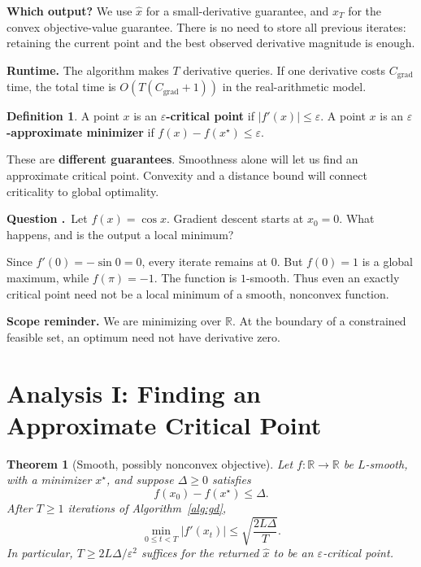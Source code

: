 \documentclass[11pt,letterpaper]{article}
\newif\ifstudentversion
\newcommand{\vs}[1]{\vspace{#1}}
\newcommand{\hide}[1]{%
  \ifstudentversion
    \ifmmode\phantom{#1}\else\underline{\phantom{#1}}\fi
  \else #1\fi}
\theoremstyle{definition}
\newtheorem{definition}{Definition}
\theoremstyle{plain}
\newtheorem{theorem}{Theorem}
\newcounter{question}
\newenvironment{Qu}{%
  \par\medskip\refstepcounter{question}
  \noindent\textbf{Question \thequestion.}\ }{\par\medskip}
\newcommand{\QU}{\begin{Qu}}
\newcommand{\R}{\mathbb R}
\newcommand{\eps}{\varepsilon}
\newcommand{\xstar}{x^\star}
\begin{document}
\textbf{Which output?} We use $\widehat x$ for a small-derivative guarantee,
and $x_T$ for the convex objective-value guarantee. There is no need to
store all previous iterates: retaining the current point and the best
observed derivative magnitude is enough.

\textbf{Runtime.} The algorithm makes \hide{$T$} derivative queries.
If one derivative costs $C_{\mathrm{grad}}$ time, the total time is
\hide{$O(T(C_{\mathrm{grad}}+1))$} in the real-arithmetic model.

\begin{definition}
A point $x$ is an \textbf{$\eps$-critical point} if $|f'(x)|\leq\eps$.
A point $x$ is an \textbf{$\eps$-approximate minimizer} if
$f(x)-f(\xstar)\leq\eps$.
\end{definition}

These are \textbf{different guarantees}. Smoothness alone will let us find
an approximate critical point. Convexity and a distance bound will connect
criticality to global optimality.

\QU Let $f(x)=\cos x$. Gradient descent starts at $x_0=0$.
What happens, and is the output a local minimum?
\end{Qu}
\begin{answer}
Since $f'(0)=-\sin0=0$, every iterate remains at $0$.
But $f(0)=1$ is a global maximum, while $f(\pi)=-1$.
The function is $1$-smooth. Thus even an exactly critical point need not
be a local minimum of a smooth, nonconvex function.
\end{answer}
\vs{0.2in}

\textbf{Scope reminder.} We are minimizing over $\R$. At the boundary of a
constrained feasible set, an optimum need not have derivative zero.

\newpage
\section{Analysis I: Finding an Approximate Critical Point}

\begin{theorem}[Smooth, possibly nonconvex objective]\label{thm:critical}
Let $f:\R\to\R$ be $L$-smooth, with a minimizer $\xstar$, and suppose $\Delta\geq0$ satisfies
\[
  f(x_0)-f(\xstar)\leq\Delta.
\]
After $T\geq1$ iterations of Algorithm~\ref{alg:gd},
\[
  \boxed{\min_{0\leq t<T}|f'(x_t)|
          \leq\sqrt{\frac{2L\Delta}{T}}.}
\]
In particular, $T\geq 2L\Delta/\eps^2$ suffices for the returned
$\widehat x$ to be an $\eps$-critical point.
\end{theorem}
\end{document}
